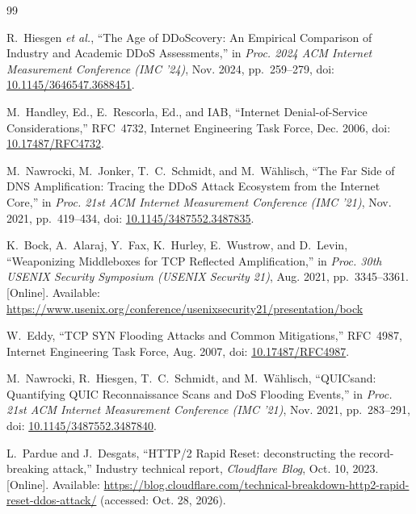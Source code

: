 \documentclass[a4paper,12pt]{article}
\begin{document}
\begin{thebibliography}{99}

R.~Hiesgen \textit{et al.}, ``The Age of DDoScovery: An Empirical Comparison of Industry and Academic DDoS Assessments,'' in \textit{Proc. 2024 ACM Internet Measurement Conference (IMC '24)}, Nov. 2024, pp.~259--279, doi: \href{https://doi.org/10.1145/3646547.3688451}{10.1145/3646547.3688451}.

M.~Handley, Ed., E.~Rescorla, Ed., and IAB, ``Internet Denial-of-Service Considerations,'' RFC~4732, Internet Engineering Task Force, Dec. 2006, doi: \href{https://doi.org/10.17487/RFC4732}{10.17487/RFC4732}.

M.~Nawrocki, M.~Jonker, T.~C.~Schmidt, and M.~Wählisch, ``The Far Side of DNS Amplification: Tracing the DDoS Attack Ecosystem from the Internet Core,'' in \textit{Proc. 21st ACM Internet Measurement Conference (IMC '21)}, Nov. 2021, pp.~419--434, doi: \href{https://doi.org/10.1145/3487552.3487835}{10.1145/3487552.3487835}.

K.~Bock, A.~Alaraj, Y.~Fax, K.~Hurley, E.~Wustrow, and D.~Levin, ``Weaponizing Middleboxes for TCP Reflected Amplification,'' in \textit{Proc. 30th USENIX Security Symposium (USENIX Security 21)}, Aug. 2021, pp.~3345--3361. [Online]. Available: \url{https://www.usenix.org/conference/usenixsecurity21/presentation/bock}

W.~Eddy, ``TCP SYN Flooding Attacks and Common Mitigations,'' RFC~4987, Internet Engineering Task Force, Aug. 2007, doi: \href{https://doi.org/10.17487/RFC4987}{10.17487/RFC4987}.

M.~Nawrocki, R.~Hiesgen, T.~C.~Schmidt, and M.~Wählisch, ``QUICsand: Quantifying QUIC Reconnaissance Scans and DoS Flooding Events,'' in \textit{Proc. 21st ACM Internet Measurement Conference (IMC '21)}, Nov. 2021, pp.~283--291, doi: \href{https://doi.org/10.1145/3487552.3487840}{10.1145/3487552.3487840}.

L.~Pardue and J.~Desgats, ``HTTP/2 Rapid Reset: deconstructing the record-breaking attack,'' Industry technical report, \textit{Cloudflare Blog}, Oct. 10, 2023. [Online]. Available: \url{https://blog.cloudflare.com/technical-breakdown-http2-rapid-reset-ddos-attack/} (accessed: Oct. 28, 2026).


\end{thebibliography}
\end{document}
